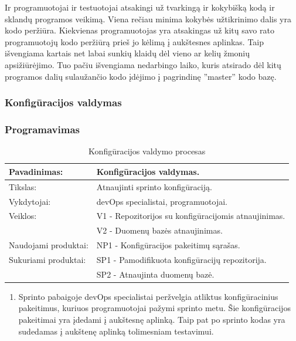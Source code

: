 \documentclass{VUMIFPSkursinis}
\begin{document}
	\par Ir programuotojai ir testuotojai atsakingi už tvarkingą ir kokybišką kodą ir sklandų programos veikimą. Viena rečiau minima kokybės užtikrinimo dalis yra kodo peržiūra. Kiekvienas programuotojas yra atsakingas už kitų savo rato programuotojų kodo peržiūrą prieš jo kėlimą į aukštesnes aplinkas. Taip išvengiama kartais net labai sunkių klaidų dėl vieno ar kelių žmonių apsižiūrėjimo. Tuo pačiu išvengiama nedarbingo laiko, kuris atsirado dėl kitų programos dalių sulaužančio kodo įdėjimo į pagrindinę ''master'' kodo bazę.
	\subsubsection{Konfigūracijos valdymas}
	\subsubsection{Programavimas}
	\begin{center}
		\begin{table}[ht]
		\caption{Konfigūracijos valdymo procesas}
		\begin{tabular}{ | l | l | } 
		\hline
		Pavadinimas:         & Konfigūracijos valdymas.                      \\ \hline
		Tikslas: 	           & Atnaujinti sprinto konfigūraciją.      \\ \hline
		Vykdytojai:          & devOps specialistai, programuotojai.                       \\ \hline
		Veiklos:             & V1 - Repozitorijos su konfigūracijomis atnaujinimas. 									  \\
						             & V2 - Duomenų bazės atnaujinimas. 							 \\ \hline
		Naudojami produktai: & NP1 - Konfigūracijos pakeitimų sąrašas.								 \\ \hline
		Sukuriami produktai: & SP1 - Pamodifikuota konfigūracijų repozitorija. 							  		\\
												 & SP2 - Atnaujinta duomenų bazė. 											 \\  \hline
		\end{tabular}
	\end{table}
		\end{center}
		\begin{enumerate}
			\item Sprinto pabaigoje devOps specialistai peržvelgia atliktus konfigūracinius pakeitimus, kuriuos programuotojai pažymi sprinto metu. Šie konfigūracijos pakeitimai yra įdedami į aukštesnę aplinką. Taip pat po sprinto kodas yra sudedamas į aukštenę aplinką tolimesniam testavimui.
		\end{enumerate}
\end{document}
